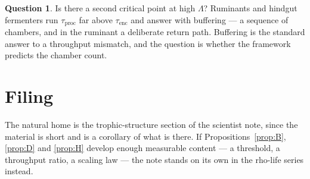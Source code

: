 \documentclass[11pt]{article}
\theoremstyle{plain}
\theoremstyle{definition}
\newtheorem{question}{Question}
\begin{document}
\begin{question}
Is there a second critical point at high $\Lambda$? Ruminants and hindgut fermenters run
$\tau_{\mathrm{proc}}$ far above $\tau_{\mathrm{enc}}$ and answer with buffering --- a sequence of
chambers, and in the ruminant a deliberate return path. Buffering is the standard answer to a
throughput mismatch, and the question is whether the framework predicts the chamber count.
\end{question}

\section{Filing}
\label{sec:filing}

The natural home is the trophic-structure section of the scientist note, since the material is short
and is a corollary of what is there. If Propositions~\ref{prop:B}, \ref{prop:D} and \ref{prop:H} develop
enough measurable content --- a threshold, a throughput ratio, a scaling law --- the note stands on its
own in the rho-life series instead.
\end{document}
